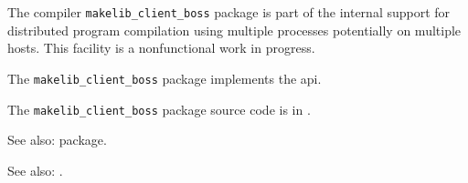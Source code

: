 
The compiler {\tt makelib\_client\_boss} package is part of the internal 
support for distributed program compilation using multiple processes 
potentially on multiple hosts.  This facility is a nonfunctional 
work in progress.

The {\tt makelib\_client\_boss} package implements the  api.

The {\tt makelib\_client\_boss} package source code is in .

See also:  package.

See also: .

